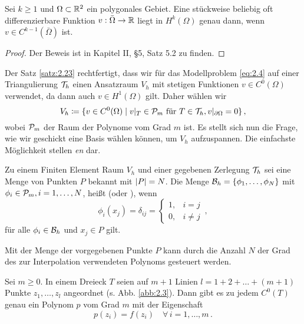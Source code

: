 \begin{satz}\label{satz:2.23}
Sei $k \ge 1$ und $\Omega\subset \mathbb{R}^2$ ein polygonales Gebiet. Eine stückweise beliebig oft differenzierbare Funktion $v : \bar \Omega \rightarrow \mathbb{R}$ liegt in $H^k(\Omega)$ genau dann, wenn $v \in C^{k-1}(\bar\Omega)$ ist.
\end{satz}

\begin{proof}
Der Beweis ist in \cite{BraeFEM} Kapitel II, \S5, Satz 5.2 zu finden.
\end{proof}


Der Satz \ref{satz:2.23} rechtfertigt, dass wir für das Modellproblem \eqref{eq:2.4} auf einer Triangulierung $\mathcal T_h$ einen Ansatzraum $V_h$ mit stetigen Funktionen $v \in C^0(\Omega)$ verwendet, da dann auch $v \in H^1(\Omega)$ gilt. Daher wählen wir
\[
	V_h \coloneqq \{v \in C^0(\Omega) \mid v|_T \in \mathcal P_m \text{ für } T\in \mathcal T_h, v|_{\partial \Omega} = 0\} \, ,
\]
wobei $\mathcal P_m$ der Raum der Polynome vom Grad $m$ ist. Es stellt sich nun die Frage, wie wir geschickt eine Basis wählen können, um $V_h$ aufzuspannen. Die einfachste Möglichkeit stellen \textit{en} dar.

\begin{defi}\label{def:2.24}
Zu einem Finiten Element Raum $V_h$ und einer gegebenen Zerlegung $\mathcal T_h$ sei eine Menge von Punkten $P$ bekannt mit $\lvert P\rvert = N$. Die Menge $\mathcal B_h = \{\phi_1,\ldots,\phi_N\}$ mit $\phi_i \in \mathcal P_m, i = 1,\ldots, N$, heißt \textit{} (oder \textit{}), wenn
\[
	\phi_i (x_j) = \delta_{ij} = \begin{cases}
							1, &  i = j \\
							0 ,& i \not = j
						\end{cases} \, , %
\]
für alle $\phi_i \in \mathcal B_h$ und $x_j \in P$ gilt.
\end{defi}


Mit der Menge der vorgegebenen Punkte $P$ kann durch die Anzahl $N$ der Grad des zur Interpolation verwendeten Polynoms gesteuert werden.


\begin{bem}
Sei $m \ge 0$. In einem Dreieck $T$ seien auf $m+1$ Linien $l = 1+2+\ldots+(m+1)$ Punkte $z_1,\ldots,z_l$ angeordnet (s. Abb. \ref{abb:2.3}). Dann gibt es zu jedem $C^0(T)$ genau ein Polynom $p$ vom Grad $m$ mit der Eigenschaft
\[
	p(z_i) = f(z_i) \quad \forall \, i = 1,\ldots,m \, .
\]
\end{bem}

